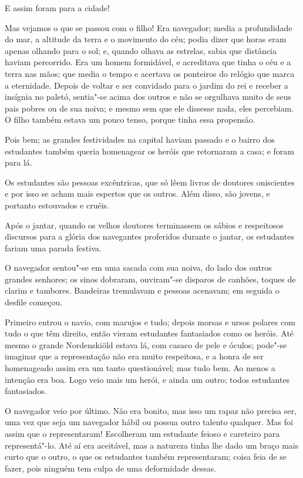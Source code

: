 E assim foram para a cidade!
\asterisc

Mas vejamos o que se passou com o filho! Era navegador; media a
profundidade do mar, a altitude da terra e o movimento do céu; podia
dizer que horas eram apenas olhando para o sol; e, quando olhava as
estrelas, sabia que distância haviam percorrido. Era um homem
formidável, e acreditava que tinha o céu e a terra nas mãos; que media
o tempo e acertava os ponteiros do relógio que marca a eternidade.
Depois de voltar e ser convidado para o jardim do rei e receber a
insígnia no paletó, sentia"-se acima dos outros e não se orgulhava
muito de seus pais pobres ou de sua noiva; e mesmo sem que ele dissesse
nada, eles percebiam. O filho também estava um pouco tenso, porque
tinha essa propensão.

Pois bem; as grandes festividades na capital haviam passado e o bairro
dos estudantes também queria homenagear os heróis que retornaram a
casa; e foram para lá. 

Os estudantes são pessoas excêntricas, que só lêem livros de doutores
oniscientes e por isso se acham mais espertos que os outros. Além
disso, são jovens, e portanto estouvados e cruéis.

Após o jantar, quando os velhos doutores terminassem os sábios e
respeitosos discursos para a glória dos navegantes proferidos durante o
jantar, os estudantes fariam uma parada festiva.

O navegador sentou"-se em uma sacada com sua noiva, do lado dos outros
grandes senhores; os sinos dobraram, ouviram"-se disparos de canhões,
toques de clarim e tambores. Bandeiras tremulavam e pessoas acenavam;
em seguida o desfile começou.

Primeiro entrou o navio, com marujos e tudo; depois morsas e ursos
polares com tudo o que têm direito, então vieram estudantes
fantasiados como os heróis. Até mesmo o grande Nordenskiöld estava lá,
com casaco de pele e óculos; pode"-se imaginar que a representação não
era muito respeitosa, e a honra de ser homenageado assim era um tanto
questionável; mas tudo bem. Ao menos a intenção era boa. Logo veio
mais um herói, e ainda um outro; todos estudantes fantasiados. 

O navegador veio por último. Não era bonito, mas isso um rapaz não
precisa ser, uma vez que seja um navegador hábil ou possua outro
talento qualquer. Mas foi assim que o representaram! Escolheram um
estudante feioso e careteiro para representá"-lo. Até aí era
aceitável, mas a natureza tinha lhe dado um braço mais curto que o
outro, o que os estudantes também representaram; coisa feia de se
fazer, pois ninguém tem culpa de uma deformidade dessas.

